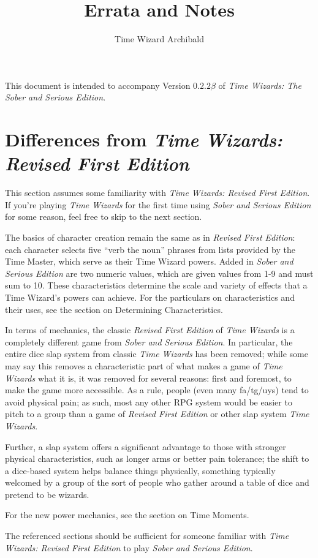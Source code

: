 \documentclass{article}
\title{\twsse{} Errata and Notes}
\author{Time Wizard Archibald}
\newcommand{\twsse}{\emph{Time Wizards: The Sober and Serious Edition}}
\newcommand{\tw}{\emph{Time Wizards}}
\newcommand{\sse}{\emph{Sober and Serious Edition}}
\newcommand{\rfe}{\emph{Revised First Edition}}
\newcommand{\vers}{$0.2.2 \beta$}
\begin{document}
\maketitle

This document is intended to accompany Version \vers{} of \twsse{}.

\section{Differences from \emph{Time Wizards: Revised First Edition}} \label{ssec:verdiff}
This section assumes some familiarity with \emph{Time Wizards: Revised First Edition}. If you're
playing \tw{} for the first time using \sse{} for some reason, feel free to skip to the next
section.

The basics of character creation remain the same as in \rfe{}: each character selects five ``verb
the noun'' phrases from lists provided by the Time Master, which serve as their Time Wizard
powers. Added in \sse{} are two numeric values, which are given values from 1-9 and must sum to
10. These characteristics determine the scale and variety of effects that a Time Wizard's powers
can achieve. For the particulars on characteristics and their uses, see the section on
Determining Characteristics.

In terms of mechanics, the classic \rfe{} of \tw{} is a completely different game from \sse{}.
In particular, the entire dice slap system from classic \tw{} has been removed; while some may
say this removes a characteristic part of what makes a game of \tw{} what it is, it was removed
for several reasons: first and foremost, to make the game more accessible. As a rule, people
(even many fa/tg/uys) tend to avoid physical pain; as such, most any other RPG system would be
easier to pitch to a group than a game of \rfe{} or other slap system \tw{}.

Further, a slap system offers a significant advantage to those with stronger physical
characteristics, such as longer arms or better pain tolerance; the shift to a dice-based system
helps balance things physically, something typically welcomed by a group of the sort of people
who gather around a table of dice and pretend to be wizards.

For the new power mechanics, see the section on Time Moments.

The referenced sections should be sufficient for someone familiar with \emph{Time Wizards:
Revised First Edition} to play \sse{}.
\end{document}
